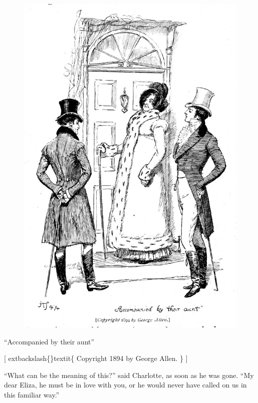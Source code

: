 \documentclass[10pt]{book}
\begin{document}
\begin{figure}[h]
\centering
\includegraphics[width=\linewidth]{images/i_254.jpg}
\end{figure}

     “Accompanied by their aunt”
    

     [
     	extbackslash\{\}textit\{
      Copyright 1894 by George Allen.
     \}
     ]
    

   “What can be the meaning of this?” said Charlotte, as soon as he was
gone. “My dear Eliza, he must be in love with you, or he would never
have called on us in this familiar way.”
  
\end{document}
